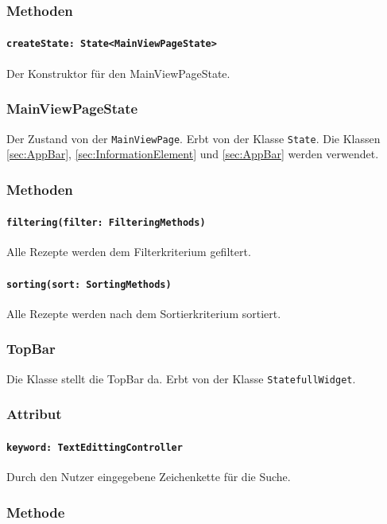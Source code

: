 \documentclass[parskip=full]{scrartcl}
\begin{document}
        \subsubsection*{Methoden}
            \paragraph*{\texttt{createState: State<MainViewPageState>}} Der Konstruktor für den MainViewPageState.

    \subsubsection{MainViewPageState}
        Der Zustand von der \texttt{MainViewPage}. Erbt von der Klasse \texttt{State}. Die Klassen \ref{sec:AppBar}, \ref{sec:InformationElement} und \ref{sec:AppBar} werden verwendet.
        \subsubsection*{Methoden}
            \paragraph*{\texttt{filtering(filter: FilteringMethods)}} Alle Rezepte werden dem Filterkriterium gefiltert.
            \paragraph*{\texttt{sorting(sort: SortingMethods)}} Alle Rezepte werden nach dem Sortierkriterium sortiert.

    \subsubsection{TopBar}
        Die Klasse stellt die TopBar da. Erbt von der Klasse \texttt{StatefullWidget}.
        \subsubsection*{Attribut}
            \paragraph*{\texttt{keyword: TextEdittingController}} Durch den Nutzer eingegebene Zeichenkette für die Suche.

        \subsubsection*{Methode}
\end{document}
